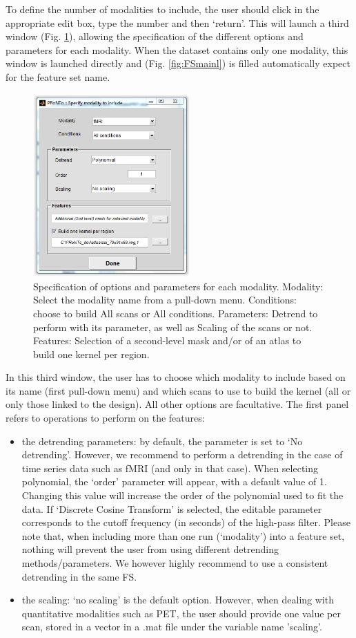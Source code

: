 To define the number of modalities to include, the user should click in the appropriate edit box, type the number and then `return'. This will launch a third window (Fig. \ref{fig:modFS}), allowing the specification of the different options and parameters for each modality. When the dataset contains only one modality, this window is launched directly and (Fig. \ref{fig:FSmainl}) is filled automatically expect for the feature set name.
\begin{figure}[!h]
  \begin{center}
      \includegraphics[height=7cm]{images/prt_ui_feature_set_modality.PNG}
   \caption{Specification of options and parameters for each modality. Modality: Select the modality name from a pull-down menu. Conditions: choose to build All scans or All conditions. Parameters: Detrend to perform with its parameter, as well as Scaling of the scans or not. Features: Selection of a second-level mask and/or of an atlas to build one kernel per region.}
    \label{fig:modFS}
  \end{center}
\end{figure}

In this third window, the user has to choose which modality to include based on its name (first pull-down menu) and  which scans to use to build the kernel (all or only those linked to the design). All other options are facultative. The first panel refers to operations to perform on the features:
\begin{itemize}
\item the detrending parameters: by default, the parameter is set to `No detrending'. However, we recommend to perform a detrending in the case of
time series data such as fMRI (and only in that case). When selecting polynomial, the `order' parameter will appear, with a default value of 1.
Changing this value will increase the order of the polynomial used to fit the data. If `Discrete Cosine Transform' is selected, the editable
parameter corresponds to the cutoff frequency (in seconds) of the high-pass filter. Please note that, when including more than one run (`modality') into a feature set, nothing will prevent the user from using different detrending methods/parameters. We however highly recommend to use a consistent detrending in the same FS.
\item the scaling: `no scaling' is the default option. However, when dealing with quantitative modalities such as PET, the user should provide one value per scan, stored in a vector in a .mat file under the variable name 'scaling'.
\end{itemize}

